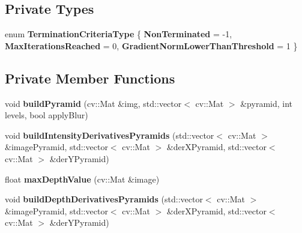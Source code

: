 \subsection*{Private Types}
\begin{DoxyCompactItemize}
\item 
enum {\bfseries TerminationCriteriaType} \{ {\bfseries NonTerminated} =  -\/1, 
{\bfseries MaxIterationsReached} =  0, 
{\bfseries GradientNormLowerThanThreshold} =  1
 \}
\end{DoxyCompactItemize}
\subsection*{Private Member Functions}
\begin{DoxyCompactItemize}
\item 
\hypertarget{class_photoconsistency_odometry_1_1_bi_objective_1_1_c_photoconsistency_odometry_bi_objective_a7067fc7eb48845fb49abeceb484b20ff}{
void {\bfseries buildPyramid} (cv::Mat \&img, std::vector$<$ cv::Mat $>$ \&pyramid, int levels, bool applyBlur)}
\label{class_photoconsistency_odometry_1_1_bi_objective_1_1_c_photoconsistency_odometry_bi_objective_a7067fc7eb48845fb49abeceb484b20ff}

\item 
\hypertarget{class_photoconsistency_odometry_1_1_bi_objective_1_1_c_photoconsistency_odometry_bi_objective_a4975f3b0ea19d2260ea68c9eca8a2e09}{
void {\bfseries buildIntensityDerivativesPyramids} (std::vector$<$ cv::Mat $>$ \&imagePyramid, std::vector$<$ cv::Mat $>$ \&derXPyramid, std::vector$<$ cv::Mat $>$ \&derYPyramid)}
\label{class_photoconsistency_odometry_1_1_bi_objective_1_1_c_photoconsistency_odometry_bi_objective_a4975f3b0ea19d2260ea68c9eca8a2e09}

\item 
\hypertarget{class_photoconsistency_odometry_1_1_bi_objective_1_1_c_photoconsistency_odometry_bi_objective_af7f26dddddb9a92e6919b15dcc57883a}{
float {\bfseries maxDepthValue} (cv::Mat \&image)}
\label{class_photoconsistency_odometry_1_1_bi_objective_1_1_c_photoconsistency_odometry_bi_objective_af7f26dddddb9a92e6919b15dcc57883a}

\item 
\hypertarget{class_photoconsistency_odometry_1_1_bi_objective_1_1_c_photoconsistency_odometry_bi_objective_aba43dcc171b6644f30dc6845492e07c4}{
void {\bfseries buildDepthDerivativesPyramids} (std::vector$<$ cv::Mat $>$ \&imagePyramid, std::vector$<$ cv::Mat $>$ \&derXPyramid, std::vector$<$ cv::Mat $>$ \&derYPyramid)}
\label{class_photoconsistency_odometry_1_1_bi_objective_1_1_c_photoconsistency_odometry_bi_objective_aba43dcc171b6644f30dc6845492e07c4}


\end{DoxyCompactItemize}
